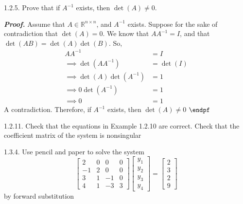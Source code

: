 \documentclass{report}
\begin{document}


    \bigbreak \noindent 
    \begin{mdframed}
        1.2.5. Prove that if $A^{-1}$ exists, then $\det(A) \ne 0$.
    \end{mdframed}
    \bigbreak \noindent 
    \textbf{\textit{Proof.}} Assume that $A\in \mathbb{R}^{n\times n}$, and $A^{-1}$ exists.
    \bigbreak \noindent 
    Suppose for the sake of contradiction that $\det(A) = 0$. We know that $AA^{-1} = I$, and that $\det(AB) = \det(A)\det(B)$. So,
    \begin{align*}
        AA^{-1} &= I \\
        \implies \det(AA^{-1}) &= \det(I) \\
        \implies \det(A)\det(A^{-1}) &= 1 \\
        \implies 0\det(A^{-1}) &= 1 \\
        \implies 0 &= 1
    \end{align*}
    A contradiction. Therefore, if $A^{-1}$ exists, then $\det(A) \ne 0$ $\endpf$

    \bigbreak \noindent 
    \begin{mdframed}
        1.2.11. Check that the equations in Example 1.2.10 are correct. Check that the coefficient matrix of the system is nonsingular
    \end{mdframed}

    \pagebreak \bigbreak \noindent 
    \begin{mdframed}
        1.3.4. Use pencil and paper to solve the system
        \[
            \begin{bmatrix}
                2 & 0 & 0 & 0 \\
                -1 & 2 & 0 & 0 \\
                3 & 1 & -1 & 0 \\
                4 & 1 & -3 & 3
            \end{bmatrix}
            \begin{bmatrix}
                y_{1} \\
                y_{2} \\
                y_{3} \\
                y_{4}
            \end{bmatrix}
            =
            \begin{bmatrix}
                2 \\
                3 \\
                2 \\
                9
            \end{bmatrix}
        \]
        by forward substitution
    \end{mdframed}
\end{document}

